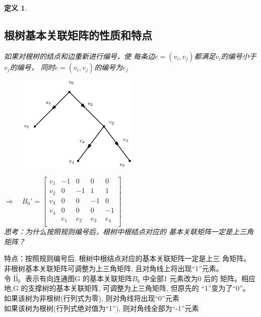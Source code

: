 \documentclass[11pt,a4paper,openany]{book}
\newcommand{\hwxw}{\CJKfamily{hwxw}}
\newtheorem{defination}{\textbf{定义}}[section]
\begin{document}
\begin{defination}
\subsection{根树基本关联矩阵的性质和特点}
如果对根树的结点和边重新进行编号，使
每条边$e=(v_i,v_j)$都满足$v_i$的编号小于$v_j$的编号，
同时$e=(v_i,v_j)$的编号为$e_j$
\begin{figure}[H]
  \centering
  \includegraphics[width=0.5\textwidth]{3_7.eps}\\
  \caption*{}
\end{figure}
$\Rightarrow \quad B_0'=\left[
                         \begin{array}{ccccc}
                           v_1& -1 & 0 & 0 & 0\\
                           v_2 & 0 & -1& 1 & 1 \\
                           v_3 & 0 & 0 & -1& 0 \\
                           v_4 & 0 & 0 & 0 & -1 \\
                          & e_1  & e_2 & e_3 & e_4 \\
                         \end{array}
                       \right]
$\\
{\hwxw 思考：为什么按照规则编号后，根树中根结点对应的
基本关联矩阵一定是上三角矩阵？\\}
\end{defination}
\begin{shaded}
特点：按照规则编号后, 根树中根结点对应的基本关联矩阵一定是上三
角矩阵。\\
非根树基本关联矩阵可调整为上三角矩阵, 且对角线上将出现“1”元素。\\
令${\mathop{B}\limits^{\rightharpoonup}}_k$ 表示有向连通图G 的基本关联矩阵$B_k$ 中全部1 元素改为0 后的
矩阵。相应地,G 的支撑树的基本关联矩阵, 可调整为上三角矩阵, 但原先的
“1”变为了“0”。\\
\indent 如果该树为非根树(行列式为零), 则对角线将出现“0”元素\\
\indent 如果该树为根树(行列式绝对值为“1”), 则对角线全部为“-1”元素
\end{shaded}
\end{document}
